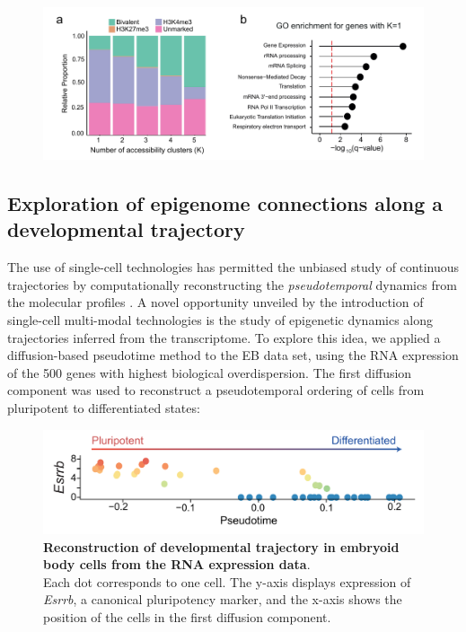 \begin{figure}[H]
	\centering
	\includegraphics[width=0.9\linewidth]{scNMT_profiles_clusters2}
	\caption[]{
	}
	\label{fig:scnmt_profiles_clusters2}
\end{figure}


\subsection{Exploration of epigenome connections along a developmental trajectory}

The use of single-cell technologies has permitted the unbiased study of continuous trajectories by computationally reconstructing the \textit{pseudotemporal} dynamics from the molecular profiles \cite{Trapnell2014,Haghverdi2016,Saelens2018}. A novel opportunity unveiled by the introduction of single-cell multi-modal technologies is the study of epigenetic dynamics along trajectories inferred from the transcriptome. To explore this idea, we applied a diffusion-based pseudotime method\cite{Haghverdi2016} to the EB data set, using the RNA expression of the 500 genes with highest biological overdispersion\cite{Lun2016}. The first diffusion component was used to reconstruct a pseudotemporal ordering of cells from pluripotent to differentiated states:

\begin{figure}[H]
	\centering
	\includegraphics[width=0.9\linewidth]{scNMT_pseudotime}
	\caption[]{\textbf{Reconstruction of developmental trajectory in embryoid body cells from the RNA expression data}.\\
	Each dot corresponds to one cell. The y-axis displays expression of \textit{Esrrb}, a canonical pluripotency marker, and the x-axis shows the position of the cells in the first diffusion component.}
	\label{fig:scnmt_pseudotime}
\end{figure}


